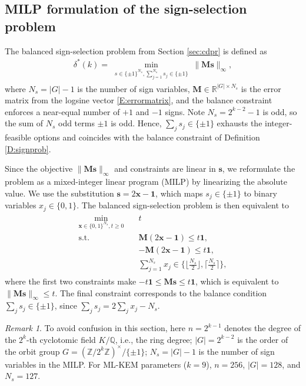 \documentclass[11pt,a4paper]{article}
\theoremstyle{plain}
\theoremstyle{definition}
\theoremstyle{remark}
\newtheorem{remark}[theorem]{Remark}
\newcommand{\Z}{\mathbb{Z}}
\newcommand{\Q}{\mathbb{Q}}
\newcommand{\R}{\mathbb{R}}
\begin{document}
\subsection{MILP formulation of the sign-selection problem}

The balanced sign-selection problem from Section \ref{sec:cdpr} is defined as
\begin{align}
  \delta^*(k)=\min_{\substack{s\in\{\pm1\}^{N_s}, 
  \sum_{j=1}^{N_s} s_j\in\{\pm 1\}}} \|\mathbf{M} \mathbf{s}\|_\infty,
  \label{E:signprobv1}
\end{align}
where $N_s=|G|-1$ is the number of sign variables, $\mathbf{M}\in\R^{|G|\times N_s}$ is the error matrix from the logsine vector \eqref{E:errormatrix}, and the balance constraint enforces a near-equal number of $+1$ and $-1$ signs. Note $N_s=2^{k-2}-1$ is odd, so the sum of $N_s$ odd terms $\pm1$ is odd. Hence, $\sum_j s_j\in\{\pm 1\}$ exhausts the integer-feasible options and coincides with the balance constraint of Definition \ref{D:signprob}.

Since the objective $\|\mathbf{M}\mathbf{s}\|_\infty$ and constraints are linear in $\mathbf{s}$, we reformulate the problem as a mixed-integer linear program (MILP) by linearizing the absolute value. We use the substitution $\mathbf{s}=2\mathbf{x}-\mathbf{1}$, which maps $s_j\in\{\pm1\}$ to binary variables $x_j\in\{0,1\}$. The balanced sign-selection problem is then equivalent to
\begin{align}
\begin{aligned}
  \min_{\mathbf{x}\in\{0,1\}^{N_s},t\ge 0}\quad & t \\
  \text{s.t.}\quad & \mathbf{M}(2\mathbf{x}-\mathbf{1}) \le t\mathbf{1}, \\
  & -\mathbf{M}(2\mathbf{x}-\mathbf{1}) \le t\mathbf{1}, \\
  & \sum_{j=1}^{N_s} x_j \in \{ \lfloor \tfrac{N_s}{2} \rfloor, \lceil \tfrac{N_s}{2} \rceil \},
\end{aligned}
\label{E:milp}
\end{align}
where the first two constraints make $-t \mathbf{1} \le \mathbf{M}\mathbf{s} \le t \mathbf{1}$, which is equivalent to $\|\mathbf{M}\mathbf{s}\|_\infty \le t$. The final constraint corresponds to the balance condition $\sum_j s_j\in\{\pm1\}$, since $\sum_j s_j=2\sum_j x_j-N_s$.

\begin{remark}\label{rem:notation}
To avoid confusion in this section, here $n=2^{k-1}$ denotes the degree of the $2^k$-th cyclotomic field $K/\Q$, i.e., the ring degree; $|G|=2^{k-2}$ is the order of the orbit group $G=(\Z/2^k\Z)^\times/\{\pm1\}$; $N_s=|G|-1$ is the number of sign variables in the MILP. For ML-KEM parameters ($k=9$), $n=256$, $|G|=128$, and $N_s=127$.
\end{remark}
\end{document}
